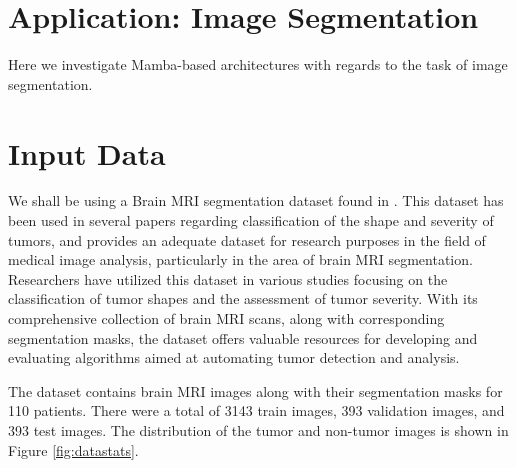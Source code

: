\documentclass[conference]{IEEEtran}
\begin{document}
\section{Application: Image Segmentation}
Here we investigate Mamba-based architectures with regards to the task of image segmentation.

\section{Input Data}\label{sec2}
We shall be using a Brain MRI segmentation dataset found in \cite{dataset}. This dataset has been used in several papers regarding classification of the shape and severity of tumors, and provides an adequate dataset for research purposes in the field of medical image analysis, particularly in the area of brain MRI segmentation. Researchers have utilized this dataset in various studies focusing on the classification of tumor shapes and the assessment of tumor severity. With its comprehensive collection of brain MRI scans, along with corresponding segmentation masks, the dataset offers valuable resources for developing and evaluating algorithms aimed at automating tumor detection and analysis.

The dataset contains brain MRI images along with their segmentation masks for 110 patients. There were a total of 3143 train images, 393 validation images, and 393 test images. The distribution of the tumor and non-tumor images is shown in Figure \ref{fig:datastats}.
\end{document}
